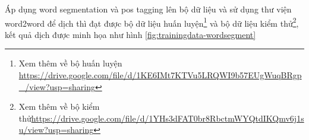 \begin{table}[]
\begin{center}

\end{center}
\caption{Danh sách cách POS tags phổ biến}
    \label{fig:Part-Of-Speech (POS) tags}
\end{table}

Áp dụng word segmentation và pos tagging lên bộ dữ liệu và sử dụng thư viện word2word để dịch thì đạt được bộ dữ liệu huấn luyện\footnote{Xem thêm về bộ huấn luyện \url{https://drive.google.com/file/d/1KE6IMt7KTVu5LRQWI9b57EUgWuqBRgp_/view?usp=sharing}} và bộ dữ liệu kiểm thử\footnote{Xem thêm về bộ kiểm thử\url{https://drive.google.com/file/d/1YHs3dFAT0br8RbctmWYQtdIKQmv6j1su/view?usp=sharing}}, kết quả dịch được minh họa như hình \ref{fig:trainingdata-wordsegment}

